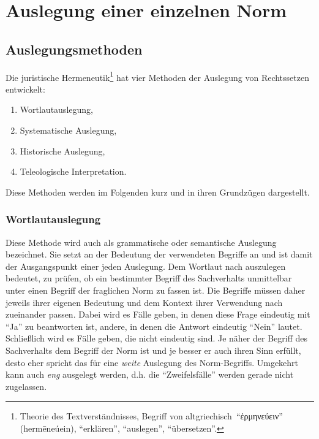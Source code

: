 \section{Auslegung einer einzelnen Norm}
\subsection{Auslegungsmethoden}
Die juristische Hermeneutik\footnote{Theorie des Textverständnisses, Begriff von altgriechisch \enquote{ἑρμηνεύειν} (hermēneúein), \enquote{erklären}, \enquote{auslegen}, \enquote{übersetzen}.} hat vier Methoden der Auslegung von Rechtssetzen entwickelt:
\begin{enumerate}
\item Wortlautauslegung,
\item Systematische Auslegung,
\item Historische Auslegung,
\item Teleologische Interpretation.
\end{enumerate}

Diese Methoden werden im Folgenden kurz und in ihren Grundzügen dargestellt.

\subsubsection{Wortlautauslegung}
Diese Methode wird auch als grammatische oder semantische Auslegung bezeichnet.
Sie setzt an der Bedeutung der verwendeten Begriffe an und ist damit der Ausgangspunkt einer jeden Auslegung.
Dem Wortlaut nach auszulegen bedeutet, zu prüfen, ob ein bestimmter Begriff des Sachverhalts unmittelbar unter einen Begriff der fraglichen Norm zu fassen ist.
Die Begriffe müssen daher jeweils ihrer eigenen Bedeutung und dem Kontext ihrer Verwendung nach zueinander passen.
Dabei wird es Fälle geben, in denen diese Frage eindeutig mit \enquote{Ja} zu beantworten ist, andere, in denen die Antwort eindeutig \enquote{Nein} lautet.
Schließlich wird es Fälle geben, die nicht eindeutig sind.
Je näher der Begriff des Sachverhalts dem Begriff der Norm ist und je besser er auch ihren Sinn erfüllt, desto eher spricht das für eine \emph{weite} Auslegung des Norm-Begriffs.
Umgekehrt kann auch \emph{eng} ausgelegt werden, d.h. die \enquote{Zweifelsfälle} werden gerade nicht zugelassen.

